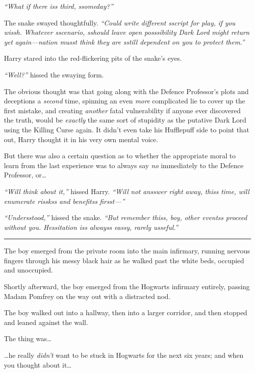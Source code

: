 \emph{``What if there iss third, ssomeday?''}

The snake swayed thoughtfully. \emph{``Could write different sscript for
play, if you wissh. Whatever sscenario, sshould leave open posssibility
Dark Lord might return yet again---nation musst think they are sstill
dependent on you to protect them.''}

Harry stared into the red-flickering pits of the snake's eyes.

\emph{``Well?''} hissed the swaying form.

The obvious thought was that going along with the Defence Professor's
plots and deceptions a \emph{second} time, spinning an even \emph{more}
complicated lie to cover up the first mistake, and creating
\emph{another} fatal vulnerability if anyone ever discovered the truth,
would be \emph{exactly} the same sort of stupidity as the putative Dark
Lord using the Killing Curse again. It didn't even take his Hufflepuff
side to point that out, Harry thought it in his very own mental voice.

But there was also a certain question as to whether the appropriate
moral to learn from the last experience was to always say \emph{no}
immediately to the Defence Professor, or\ldots{}

\emph{``Will think about it,''} hissed Harry. \emph{``Will not ansswer
right away, thiss time, will enumerate risskss and benefitss
firsst---''}

\emph{``Undersstood,''} hissed the snake. \emph{``But remember thiss,
boy, other eventss proceed without you. Hessitation iss alwayss eassy,
rarely usseful.''}

\begin{center}\rule{3in}{0.4pt}\end{center}

The boy emerged from the private room into the main infirmary, running
nervous fingers through his messy black hair as he walked past the white
beds, occupied and unoccupied.

Shortly afterward, the boy emerged from the Hogwarts infirmary entirely,
passing Madam Pomfrey on the way out with a distracted nod.

The boy walked out into a hallway, then into a larger corridor, and then
stopped and leaned against the wall.

The thing was\ldots{}

\ldots{}he really \emph{didn't} want to be stuck in Hogwarts for the
next six years; and when you thought about it\ldots{}

